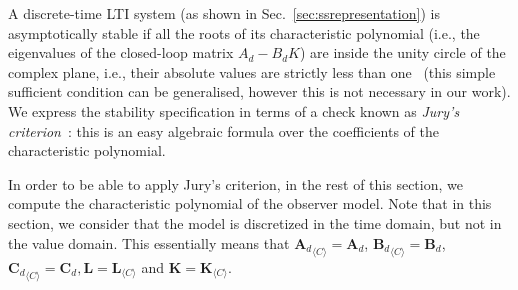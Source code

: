 \documentclass[sigconf]{llncs}
\newcommand{\mat}[1]{\boldsymbol{#1}}
\begin{document}

A discrete-time LTI system (as shown in Sec.~\ref{sec:ssrepresentation})
is asymptotically stable if all the roots of its characteristic
polynomial (i.e., the eigenvalues of the closed-loop matrix $A_d - B_d
K$) are inside the unity circle of the complex plane, i.e., their
absolute values are strictly less than one~\cite{astrom1997computer}
(this simple sufficient condition can be generalised, however this is
not necessary in our work).  We express the stability
specification in terms of a check known as
\emph{Jury's criterion}~\cite{fadali}: this is an easy algebraic
formula over the coefficients of the characteristic polynomial.

In order to be able to apply Jury's criterion,
in the rest of this section, we compute the  
characteristic polynomial of the observer model.
Note that in this section, we consider that the model is
discretized in the time domain, but not in the value domain.
This essentially means that
${\mat{A}_d}_{\langle C \rangle}=\mat{A}_d$, ${\mat{B}_d}_{\langle C \rangle}=\mat{B}_d$, ${\mat{C}_d}_{\langle C \rangle}=\mat{C}_d, \mat{L}=\mat{L}_{\langle C \rangle}$ and $\mat{K}=\mat{K}_{\langle C \rangle}$.

\end{document}

